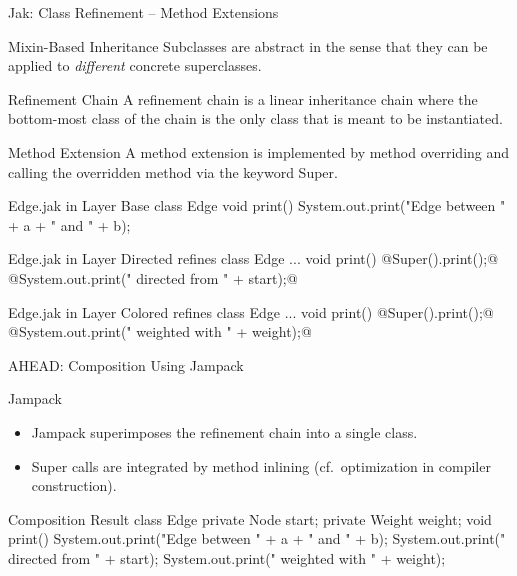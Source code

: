 \begin{frame}[fragile]{Jak: Class Refinement -- Method Extensions}
	\begin{fancycolumns}[animation=none]
		\begin{definition}{Mixin-Based Inheritance}
			Subclasses are abstract in the sense that they can be applied to \emph{different} concrete superclasses.
		\end{definition}
		\begin{definition}{Refinement Chain}
			A refinement chain is a linear inheritance chain where the bottom-most class of the chain is the only class that is meant to be instantiated.
		\end{definition}
		\begin{definition}{Method Extension}
			A method extension is implemented by method overriding and calling the overridden method via the keyword Super.
		\end{definition}
	\nextcolumn
	\footnotesize
\begin{codetight}[basicstyle=\tiny]{Edge.jak in Layer Base}
class Edge {
	void print() {
		System.out.print("Edge between " + a + " and " + b);
	}
}
\end{codetight}
\begin{codetight}[basicstyle=\tiny]{Edge.jak in Layer Directed}
refines class Edge {
	...
	void print() {
		@Super().print();@
		@System.out.print(" directed from " + start);@
	}
}
\end{codetight}
\begin{codetight}[basicstyle=\tiny]{Edge.jak in Layer Colored}
refines class Edge {
	...
	void print() {
		@Super().print();@
		@System.out.print(" weighted with " + weight);@
	}
}
\end{codetight}
	\end{fancycolumns}
\end{frame}

\begin{frame}[fragile]{AHEAD: Composition Using Jampack}
	\begin{fancycolumns}[widths={35,65},animation=none]
		\begin{definition}{Jampack}
			\begin{itemize}
				\item Jampack superimposes the refinement chain into a single class.
				\item Super calls are integrated by method inlining (cf.\ optimization in compiler construction).
			\end{itemize}
		\end{definition}
	\nextcolumn
\begin{codetight}{Composition Result}
class Edge {
	private Node start;
	private Weight weight;
	void print() {
		System.out.print("Edge between " + a + " and " + b);
		System.out.print(" directed from " + start);
		System.out.print(" weighted with " + weight);
	}
}
\end{codetight}
	\end{fancycolumns}
\end{frame}

